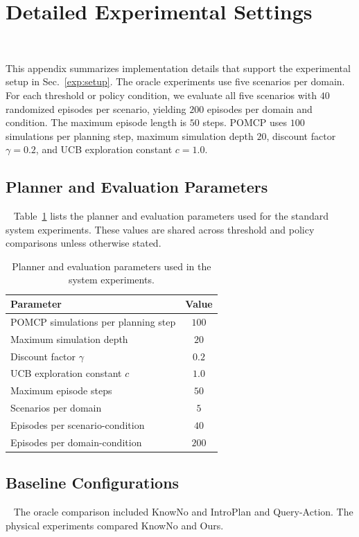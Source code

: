 \section{Detailed Experimental Settings}~\label{appx:settings}

This appendix summarizes implementation details that support the experimental setup in Sec.~\ref{exp:setup}. The oracle experiments use five scenarios per domain. For each threshold or policy condition, we evaluate all five scenarios with $40$ randomized episodes per scenario, yielding $200$ episodes per domain and condition. The maximum episode length is $50$ steps. POMCP uses $100$ simulations per planning step, maximum simulation depth $20$, discount factor $\gamma=0.2$, and UCB exploration constant $c=1.0$.

\subsection{Planner and Evaluation Parameters}~\label{appx:planner_params}
Table~\ref{tab:app_planner_params} lists the planner and evaluation parameters used for the standard system experiments. These values are shared across threshold and policy comparisons unless otherwise stated.

\begin{table}[h]
\centering
\caption{Planner and evaluation parameters used in the system experiments.}
\label{tab:app_planner_params}
\small
\begin{tabular}{lc}
\toprule
\textbf{Parameter} & \textbf{Value} \\
\midrule
POMCP simulations per planning step & $100$ \\
Maximum simulation depth & $20$ \\
Discount factor $\gamma$ & $0.2$ \\
UCB exploration constant $c$ & $1.0$ \\
Maximum episode steps & $50$ \\
Scenarios per domain & $5$ \\
Episodes per scenario-condition & $40$ \\
Episodes per domain-condition & $200$ \\
\bottomrule
\end{tabular}
\end{table}

\subsection{Baseline Configurations}~\label{appx:baseline_configs}
The oracle comparison included KnowNo and IntroPlan and Query-Action. The physical experiments compared KnowNo and Ours.

